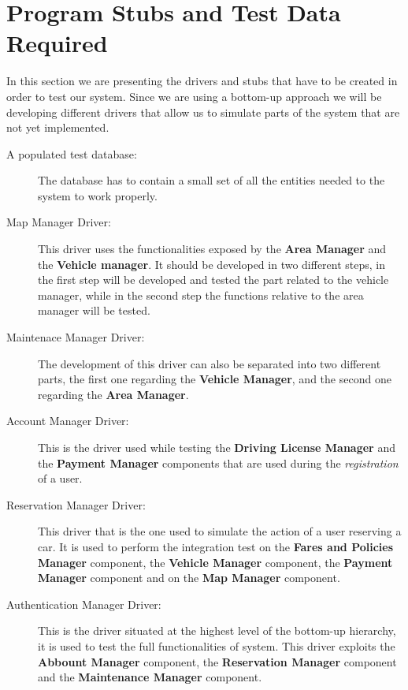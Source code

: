 \section{Program Stubs and Test Data Required}

In this section we are presenting the drivers and stubs that have to be created
in order to test our system.
Since we are using a bottom-up approach we will be developing different drivers
that allow us to simulate parts of the system that are not yet implemented.

\begin{description}

  \item[A populated test database:] The database has to contain a small set of all
  the entities needed to the system to work properly.

  \item[Map Manager Driver:] This driver uses the functionalities exposed by the
  \textbf{Area Manager} and the \textbf{Vehicle manager}. It should be developed
  in two different steps, in the first step will be developed and tested the part
  related to the vehicle manager, while in the second step the functions relative
  to the area manager will be tested.

  \item[Maintenace Manager Driver:] The development of this driver can also be
  separated into two different parts, the first one regarding the
  \textbf{Vehicle Manager}, and the second one regarding the \textbf{Area Manager}.

  \item[Account Manager Driver:] This is the driver used while testing the
  \textbf{Driving License Manager} and the \textbf{Payment Manager} components that
  are used during the \textit{registration} of a user.

  \item[Reservation Manager Driver:] This driver that is the one used to simulate
  the action of a user reserving a car. It is used to perform the integration test
  on the \textbf{Fares and Policies Manager} component, the
  \textbf{Vehicle Manager} component, the \textbf{Payment Manager} component and
  on the \textbf{Map Manager} component.

  \item[Authentication Manager Driver:] This is the driver situated at the highest
  level of the bottom-up hierarchy, it is used to test the full functionalities of
  system. This driver exploits the \textbf{Abbount Manager} component, the
  \textbf{Reservation Manager} component and the \textbf{Maintenance Manager}
  component.

\end{description}
